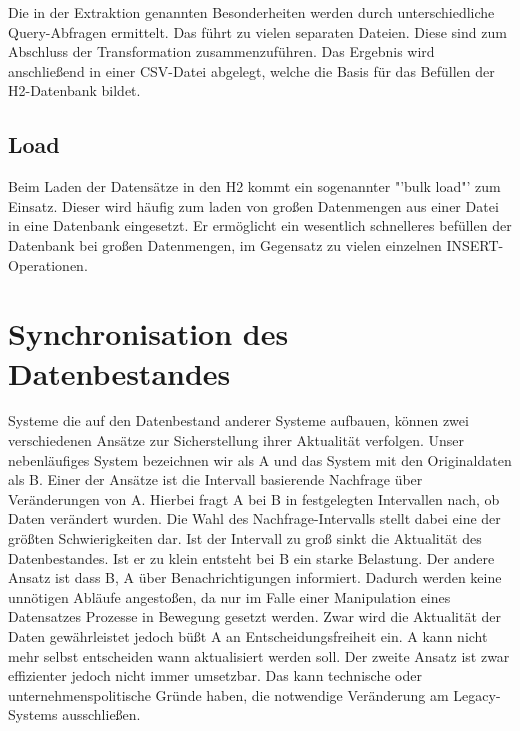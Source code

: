 Die in der Extraktion genannten Besonderheiten werden durch unterschiedliche Query-Abfragen ermittelt. Das führt zu vielen separaten Dateien. Diese sind zum Abschluss der Transformation zusammenzuführen. Das Ergebnis wird anschließend in einer CSV-Datei abgelegt, welche die Basis für das Befüllen der H2-Datenbank bildet. 

\subsection{Load}

Beim Laden der Datensätze in den H2 kommt ein sogenannter "'bulk load"' zum Einsatz. Dieser wird häufig zum laden von großen Datenmengen aus einer Datei in eine Datenbank eingesetzt. Er ermöglicht ein wesentlich schnelleres befüllen der Datenbank bei großen Datenmengen, im Gegensatz zu vielen einzelnen INSERT-Operationen.

\section{Synchronisation des Datenbestandes}
\label{ch:Konzeption:sec:updatedatenbestand}

Systeme die auf den Datenbestand anderer Systeme aufbauen, können zwei verschiedenen Ansätze zur Sicherstellung ihrer Aktualität verfolgen. Unser nebenläufiges System bezeichnen wir als A und das System mit den Originaldaten als B. Einer der Ansätze ist die Intervall basierende Nachfrage über Veränderungen von A. Hierbei fragt A bei B in festgelegten Intervallen nach, ob Daten verändert wurden. Die Wahl des Nachfrage-Intervalls stellt dabei eine der größten Schwierigkeiten dar. Ist der Intervall zu groß sinkt die Aktualität des Datenbestandes. Ist er zu klein entsteht bei B ein starke Belastung. Der andere Ansatz ist dass B, A über Benachrichtigungen informiert. Dadurch werden keine unnötigen Abläufe angestoßen, da nur im Falle einer Manipulation eines Datensatzes Prozesse in Bewegung gesetzt werden. Zwar wird die Aktualität der Daten gewährleistet jedoch büßt A an Entscheidungsfreiheit ein. A kann nicht mehr selbst entscheiden wann aktualisiert werden soll. Der zweite Ansatz ist zwar effizienter jedoch nicht immer umsetzbar. Das kann technische oder unternehmenspolitische Gründe haben, die notwendige Veränderung am Legacy-Systems ausschließen.  

